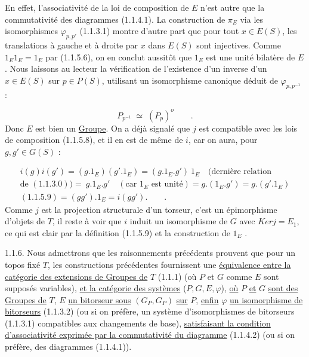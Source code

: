 En effet, l'associativité de la loi de composition de $E$ n'est autre que la commutativité des diagrammes (1.1.4.1). La construction de $\pi_E$ via les isomorphismes $\varphi_{p,p'}$ (1.1.3.1) montre d'autre part que pour tout $x \in E(S)$, les translations à gauche et à droite par $x$ dans $E(S)$ sont injectives. Comme $1_E1_E = 1_E$ par (1.1.5.6), on en conclut aussitôt que $1_E$ est une unité bilatère de $E$. Nous laissons au lecteur la vérification de l'existence d'un inverse d'un $x \in E(S)$ sur $p \in P(S)$, utilisant un isomorphisme canonique déduit de $\varphi_{p,p^{-1}}$ :

\begin{equation}\tag{1.1.5.10}
P_{p^{-1}} \;\simeq\; (P_p)^{o} \qquad .
\end{equation}
Donc $E$ est bien un \underline{Groupe}. On a déjà signalé que $j$ est compatible avec les lois de composition (1.1.5.8), et il en est de même de $i$, car on aura, pour $g,g' \in G(S)$ :

\begin{multline*}
i(g)i(g') = (g.1_E)(g'.1_E) = (g.1_E.g')\ 1_E \quad (\text{dernière relation} \\ \text{de } (1.1.3.0)) = \ g.1_E.g' \quad (\text{car } 1_E \text{ est unité}) = g.(1_E.g') = g.(g'.1_E) \\ (1.1.5.9) = (gg').1_E = i(gg'). \qquad .
\end{multline*}
Comme $j$ est la projection structurale d'un torseur, c'est un épimorphisme d'objets de \underline{$T$}, il reste à voir que $i$ induit un isomorphisme de $G$ avec $Ker j = E_1$, ce qui est clair par la définition (1.1.5.9) et la construction de $1_E$ .



1.1.6.  Nous admettrons que les raisonnements précédents prouvent que pour un topos fixé \underline{$T$}, les constructions précédentes fournissent une \underline{équivalence entre la catégorie des extensions de Groupes de} \underline{$T$} (1.1.1) (où $P$ et $G$ comme $E$ sont supposés variables), \underline{et la catégorie des systèmes} ($P,G,E,\varphi$), \underline{où} $P$ \underline{et} $G$ \underline{sont des Groupes de} \underline{$T$}, $E$ \underline{un bitorseur sous} $(G_P,G_P)$ \underline{sur} $P$, \underline{enfin} $\varphi$ \underline{un isomorphisme de bitorseurs} (1.1.3.2) (ou si on préfère, un système d'isomorphismes de bitorseurs (1.1.3.1) compatibles aux changements de base), \underline{satisfaisant la condition d'associativité exprimée par la commutativité du diagramme} (1.1.4.2) (ou si on préfère, des diagrammes (1.1.4.1)).

